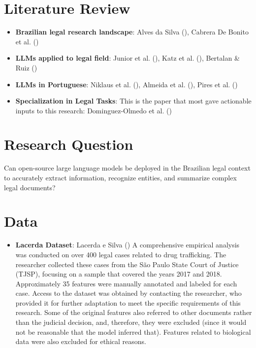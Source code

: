 \documentclass[
  12pt,
]{article}
\providecommand{\tightlist}{%
  \setlength{\itemsep}{0pt}\setlength{\parskip}{0pt}}\usepackage{longtable,booktabs,array}
\begin{document}
\section{Literature Review}\label{literature-review}

\begin{itemize}
\tightlist
\item
  \textbf{Brazilian legal research landscape}: Alves da Silva
  (), Cabrera De Bonito
  et al. ()
\item
  \textbf{LLMs applied to legal field}: Junior et al.
  (), Katz et al.
  (), Bertalan \& Ruiz
  ()
\item
  \textbf{LLMs in Portuguese}: Niklaus et al.
  (), Almeida et al.
  (), Pires et al.
  ()
\item
  \textbf{Specialization in Legal Tasks}: This is the paper that most
  gave actionable inputs to this research: Dominguez-Olmedo et al.
  ()
\end{itemize}

\section{Research Question}\label{research-question}

Can open-source large language models be deployed in the Brazilian legal
context to accurately extract information, recognize entities, and
summarize complex legal documents?

\section{Data}\label{data}

\begin{itemize}
\tightlist
\item
  \textbf{Lacerda Dataset}: Lacerda e Silva
  () A comprehensive
  empirical analysis was conducted on over 400 legal cases related to
  drug trafficking. The researcher collected these cases from the São
  Paulo State Court of Justice (TJSP), focusing on a sample that covered
  the years 2017 and 2018. Approximately 35 features were manually
  annotated and labeled for each case. Access to the dataset was
  obtained by contacting the researcher, who provided it for further
  adaptation to meet the specific requirements of this research. Some of
  the original features also referred to other documents rather than the
  judicial decision, and, therefore, they were excluded (since it would
  not be reasonable that the model inferred that). Features related to
  biological data were also excluded for ethical reasons.
\end{itemize}
\end{document}
